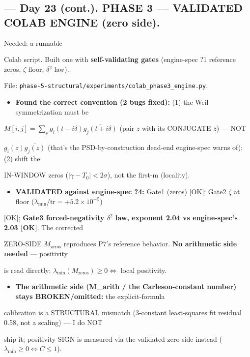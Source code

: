 \documentclass[10pt]{article}
\begin{document}
\subsection*{ --- Day 23 (cont.). PHASE 3 --- VALIDATED COLAB ENGINE (zero side).}
Needed: a runnable\par
Colab script. Built one with \textbf{self-validating gates} (engine-spec ?1 reference zeros, \ensuremath{\zeta} floor, \ensuremath{\delta}\ensuremath{^2} law).\par
File: \texttt{phase-5-structural/experiments/colab\_phase3\_engine.py}.\par
\begin{itemize}
\item \textbf{Found the correct convention (2 bugs fixed):} (1) the Weil symmetrization must be
\end{itemize}
  $M[i,j]=\sum_\rho g_i(t-i\delta)\overline{g_j(t+i\delta)}$ (pair $z$ with its CONJUGATE $\bar z$) --- NOT\par
  $g_i(z)\overline{g_j(z)}$ (that's the PSD-by-construction dead-end engine-spec warns of); (2) shift the\par
  IN-WINDOW zeros ($|\gamma-T_0|<2\sigma$), not the first-m (locality).\par
\begin{itemize}
\item \textbf{VALIDATED against engine-spec ?4:} Gate1 (zeros) [OK]; Gate2 \ensuremath{\zeta} at floor ($\lambda_{\min}/\mathrm{tr}=+5.2\times10^{-5}$)
\end{itemize}
  [OK]; \textbf{Gate3 forced-negativity $\delta^2$ law, exponent 2.04 vs engine-spec's 2.03 [OK]}. The corrected\par
  ZERO-SIDE $M_{\mathrm{zeros}}$ reproduces P7's reference behavior. \textbf{No arithmetic side needed} --- positivity\par
  is read directly: $\lambda_{\min}(M_{\mathrm{zeros}})\ge0\iff$ local positivity.\par
\begin{itemize}
\item \textbf{The arithmetic side (M\_arith / the Carleson-constant number) stays BROKEN/omitted:} the explicit-formula
\end{itemize}
  calibration is a STRUCTURAL mismatch (3-constant least-squares fit residual 0.58, not a scaling) --- I do NOT\par
  ship it; positivity SIGN is measured via the validated zero side instead ($\lambda_{\min}\ge0\iff C\le1$).\par
\end{document}
